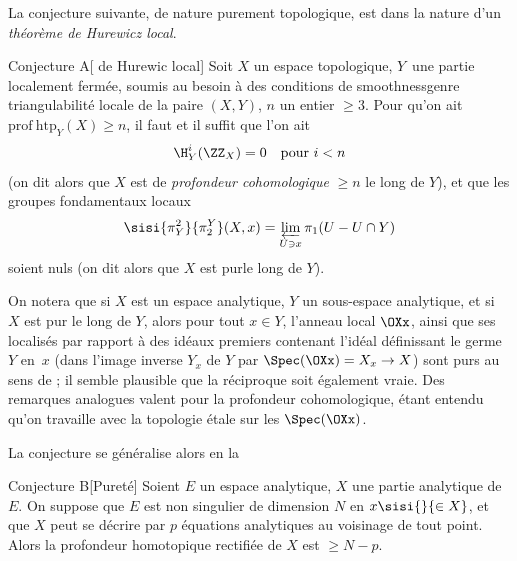 \enlargethispage{\baselineskip}%
La conjecture suivante, de nature purement topologique, est dans la nature d'un \og \emph{th\'eor\`eme de Hurewicz local}\fg.

 \label{XIII.6.A}
\begin{enonce*}{Conjecture A}[\og {} de Hurewic local{\fg}\ndemark]
Soit $X$ un espace topologique, $Y$~une partie localement ferm\'ee, soumis au besoin \`a des conditions de \og smoothness\fg genre triangulabilit\'e locale de la paire $(X, Y)$, $n$ un entier $\geq 3$. Pour qu'on ait $\mathrm{prof\:htp}_Y(X)\geq n$, il faut et il suffit que l'on ait\pageoriginale
$$
\H^i_Y(\ZZ_X)=0\quad\text{pour } i<n$$
(on dit alors que $X$ est de \emph{profondeur cohomologique} $\geq n$ le long de $Y$), et que les groupes fondamentaux locaux
$$
\sisi{\pi^2_Y}{\pi_2^Y}(X, x)=\varprojlim_{U\ni x} \pi_1(U-U\cap Y)$$
soient nuls (on dit alors que $X$ est \og pur\fg le long de $Y$).
\end{enonce*}

On notera que si $X$ est un espace analytique, $Y$ un sous-espace analytique, et si~$X$ est pur le long de $Y$, alors pour tout $x\in Y$, l'anneau local $\OXx$, ainsi que ses localis\'es par rapport \`a des id\'eaux premiers contenant l'id\'eal d\'efinissant le germe~$Y$ en~$x$ (\ie dans l'image inverse $Y_x$ de $Y$ par $\Spec(\OXx)=X_x\to X$) sont purs au sens de \Exp {}; il semble plausible que la r\'eciproque soit \'egalement vraie. Des remarques analogues valent pour la profondeur cohomologique, \'etant entendu qu'on travaille avec la topologie \'etale sur les $\Spec(\OXx)$.

La conjecture  se g\'en\'eralise alors en la

 \label{XIII.6.B}
\begin{enonce*}{Conjecture B}[\og Puret\'e{\fg}\ndemark]
Soient $E$ un espace analytique, $X$ une partie analytique de $E$. On suppose que $E$ est non singulier de dimension $N$ en $x\sisi{}{\in X}$, et que $X$ peut se d\'ecrire par $p$ \'equations analytiques au voisinage de tout point. Alors la profondeur homotopique rectifi\'ee de $X$ est $\geq N-p$.
\end{enonce*}

